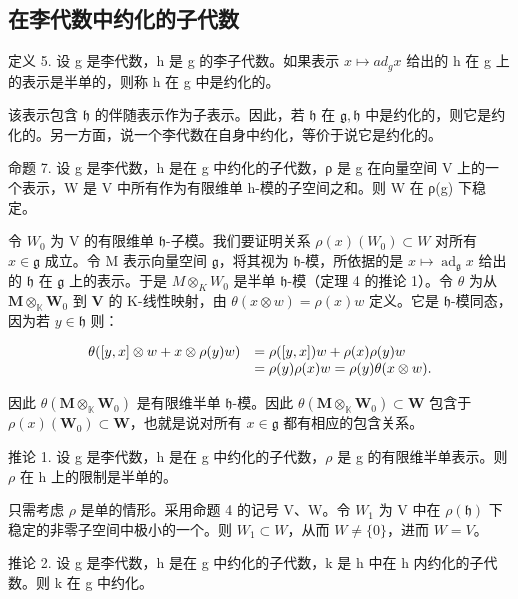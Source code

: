 \subsection{在李代数中约化的子代数}

定义 5. 设 g 是李代数，h 是 g 的李子代数。如果表示 \(x \mapsto ad_{g} x\) 给出的 h 在 g 上的表示是半单的，则称 h 在 g 中是约化的。

该表示包含 \(\mathfrak{h}\) 的伴随表示作为子表示。因此，若 \(\mathfrak{h}\) 在 \(\mathfrak{g},\mathfrak{h}\) 中是约化的，则它是约化的。另一方面，说一个李代数在自身中约化，等价于说它是约化的。

命题 7. 设 g 是李代数，h 是在 g 中约化的子代数，ρ 是 g 在向量空间 V 上的一个表示，W 是 V 中所有作为有限维单 h-模的子空间之和。则 W 在 ρ(g) 下稳定。

令 \(W_0\) 为 V 的有限维单 \(\mathfrak{h}\)-子模。我们要证明关系 \(\rho(x)(W_0) \subset W\) 对所有 \(x \in \mathfrak{g}\) 成立。令 M 表示向量空间 \(\mathfrak{g}\)，将其视为 \(\mathfrak{h}\)-模，所依据的是 \(x \mapsto \operatorname{ad}_{\mathfrak{g}} x\) 给出的 \(\mathfrak{h}\) 在 \(\mathfrak{g}\) 上的表示。于是 \(M \otimes_{K} W_0\) 是半单 \(\mathfrak{h}\)-模（定理 4 的推论 1）。令 \(\theta\) 为从 \(\mathbf{M} \otimes_{\mathbb{K}} \mathbf{W}_0\) 到 \(\mathbf{V}\) 的 K-线性映射，由 \(\theta(x \otimes w) = \rho(x)w\) 定义。它是 \(\mathfrak{h}\)-模同态，因为若 \(y \in \mathfrak{h}\) 则：

\[
\begin{array}{r l} \theta ([ y, x ] \otimes w + x \otimes \rho (y) w) & = \rho ([ y, x ]) w + \rho (x) \rho (y) w \\ & = \rho (y) \rho (x) w = \rho (y) \theta (x \otimes w). \end{array}
\]

因此 \(\theta (\mathbf{M}\otimes_{\mathbb{K}}\mathbf{W}_0)\) 是有限维半单 \(\mathfrak{h}\)-模。因此 \(\theta (\mathbf{M}\otimes_{\mathbb{K}}\mathbf{W}_0)\subset \mathbf{W}\) 包含于 \(\rho (x)(\mathbf{W}_0)\subset \mathbf{W}\)，也就是说对所有 \(x\in \mathfrak{g}\) 都有相应的包含关系。

推论 1. 设 g 是李代数，h 是在 g 中约化的子代数，\(\rho\) 是 g 的有限维半单表示。则 \(\rho\) 在 h 上的限制是半单的。

只需考虑 \(\rho\) 是单的情形。采用命题 4 的记号 V、W。令 \(W_{1}\) 为 V 中在 \(\rho(\mathfrak{h})\) 下稳定的非零子空间中极小的一个。则 \(W_{1} \subset W\)，从而 \(W \neq \{0\}\)，进而 \(W = V\)。

推论 2. 设 g 是李代数，h 是在 g 中约化的子代数，k 是 h 中在 h 内约化的子代数。则 k 在 g 中约化。

